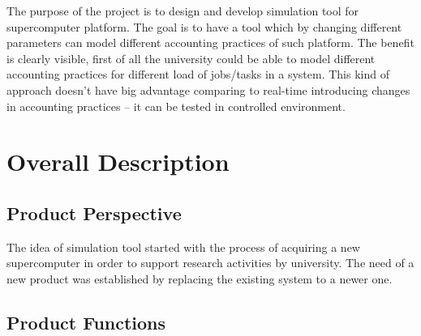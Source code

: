 \documentclass{report}
\begin{document}
The purpose of the project is to design and develop simulation tool for supercomputer platform. The goal is to have a tool which by changing different parameters can model different accounting practices of such platform. The benefit is clearly visible, first of all the university could be able to model different accounting practices for different load of jobs/tasks in a system. This kind of approach doesn't have big advantage comparing to real-time introducing changes in accounting practices -- it can be tested in controlled environment.
 


\chapter{Overall Description}

\section{Product Perspective}

The idea of simulation tool started with the process of acquiring a new supercomputer in order to support research activities by university. The need of a new product was established by replacing the existing system to a newer one.

\section{Product Functions}
\end{document}
